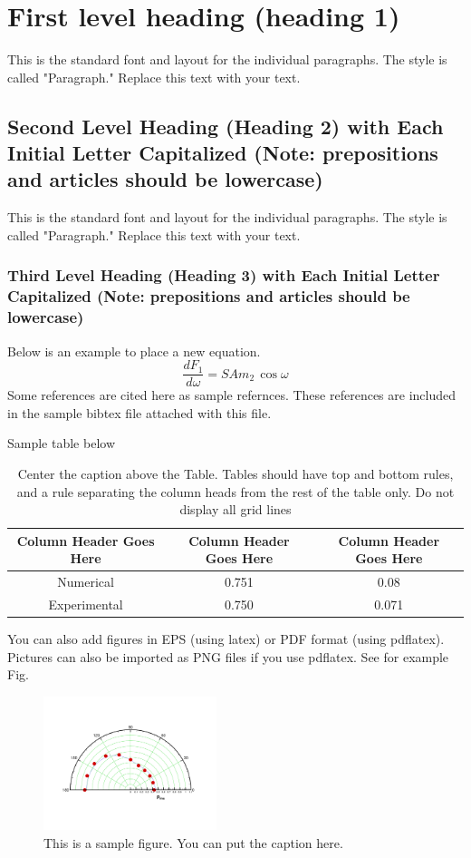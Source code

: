 \documentclass[a4paper,10pt]{ica2013_2}
\begin{document}
\section{First level heading (heading 1)}
This is the standard font and layout for the individual paragraphs.  The style is called "Paragraph."  Replace this text with your text.
\subsection{Second Level Heading (Heading 2) with Each Initial Letter Capitalized (Note: 
prepositions and articles should be lowercase)}
This is the standard font and layout for the individual paragraphs.  The style is called "Paragraph."  Replace this text with your text.
\subsubsection{Third Level Heading (Heading 3) with Each Initial Letter Capitalized (Note: prepositions and articles should be lowercase)}
Below is an example to place a new equation.
\begin{equation}
 \frac{d F_1}{d\omega}=SAm_2\,\cos \omega
\end{equation}
Some references \citep{bacon2000hot,hamilton1837third, kulvait2012nonlinear} are cited here as sample refernces. These references are included in the sample bibtex file attached with this file.

Sample table below
\begin{table}[!h]
\centering
\caption{Center the caption above the Table.  Tables should have top and bottom 
rules, and a rule separating the column heads from the rest of the table only.  Do not display all grid lines}\label{table:aerodynamic_results}
 \begin{tabular}{ccc}
\hline
\textbf{Column Header Goes Here} & \textbf{Column Header Goes Here}  & \textbf{Column Header Goes Here}\\
\hline
Numerical  & 0.751  & 0.08\\
Experimental & 0.750 & 0.071\\
\hline
 \end{tabular}
\end{table}

You can also add figures in EPS (using latex) or PDF format (using pdflatex). Pictures can also be imported as PNG files if you use pdflatex. See for example Fig.~
\begin{figure}[!h]
\centering
\includegraphics[width=0.45\textwidth]{sample_fig.pdf}
\caption{This is a sample figure. You can put the caption here.}\label{fig:sample_fig}
\end{figure}
\end{document}
